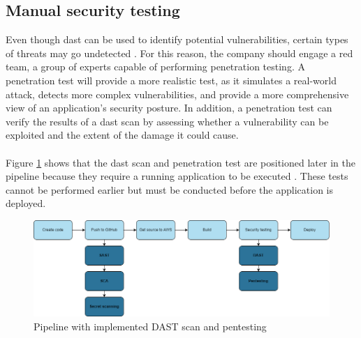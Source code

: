 \subsection{Manual security testing}


Even though \acrshort{dast} can be used to identify potential vulnerabilities, certain types of threats may go undetected \cite{dastpentesting}. For this reason, the company should engage a red team, a group of experts capable of performing penetration testing. A penetration test will provide a more realistic test, as it simulates a real-world attack, detects more complex vulnerabilities, and provide a more comprehensive view of an application's security posture. In addition, a penetration test can verify the results of a  \acrshort{dast} scan by assessing whether a vulnerability can be exploited and the extent of the damage it could cause.
\\~\\
Figure \ref{fig: Pipeline with implemented DAST scan and pentesting} shows that the \acrshort{dast} scan and penetration test are positioned later in the pipeline because they require a running application to be executed \cite{dastplacment}. These tests cannot be performed earlier but must be conducted before the application is deployed.
\vspace{2mm}
\begin{figure}[H]
    \centering
    \includegraphics[width=0.8\columnwidth]{Images/pipeline5.png}
    \caption{Pipeline with implemented DAST scan and pentesting}
    \label{fig: Pipeline with implemented DAST scan and pentesting}
\end{figure}
